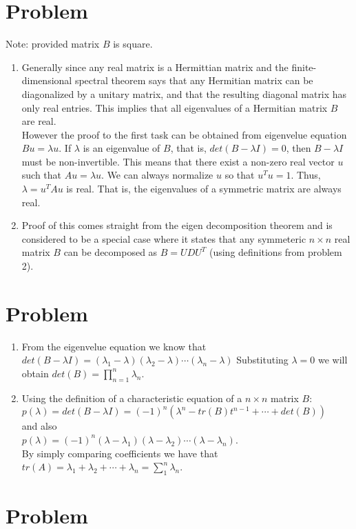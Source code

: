 \documentclass{article}
\begin{document}
	\section{Problem}
	Note: provided matrix $B$ is square.
	\begin{enumerate}
		\item Generally since any real matrix is a Hermittian matrix and the finite-dimensional spectral theorem says that any Hermitian matrix can be diagonalized by a unitary matrix, and that the resulting diagonal matrix has only real entries. This implies that all eigenvalues of a Hermitian matrix $B$ are real.\\
		
		However the proof to the first task can be obtained from eigenvelue equation $Bu=\lambda u$. If $\lambda$ is an eigenvalue of $B$, that is, $det(B-\lambda I) = 0$, then $B-\lambda I$ must be non-invertible. This means that there exist a non-zero real vector $u$ such that $Au = \lambda u$. We can always normalize $u$ so that $u^Tu = 1$. Thus, $\lambda = u^TAu$ is real. That is, the eigenvalues of a symmetric matrix are always real.
		
		\item Proof of this comes straight from the eigen decomposition theorem and is considered to be a special case where it states that any symmeteric $n \times n$ real matrix $B$ can be decomposed as $B=UDU^T$ (using definitions from problem 2).
	\end{enumerate}
	
	\section{Problem}
	\begin{enumerate}
		\item From the eigenvelue equation we know that $det(B-\lambda I)=(\lambda_1 - \lambda)(\lambda_2 - \lambda)\cdots(\lambda_n-\lambda)$ Substituting $\lambda=0$ we will obtain $det(B)=\prod_{n=1}^{n}\lambda_n.$
		\item Using the definition of a characteristic equation of a $n \times n$ matrix $B$:\\
		$p(\lambda)=det(B-\lambda I)=(-1)^n(\lambda^n-tr(B)t^{n-1}+\cdots+det(B))$\\
		and also\\
		$p(\lambda)=(-1)^n(\lambda-\lambda_1)(\lambda-\lambda_2)\cdots(\lambda-\lambda_n)$.\\
		By simply comparing coefficients we have that $tr(A)=\lambda_1+\lambda_2+\cdots+\lambda_n=\sum_{1}^{n}\lambda_n$.
	\end{enumerate}
	
	\section{Problem}
	
\end{document}
